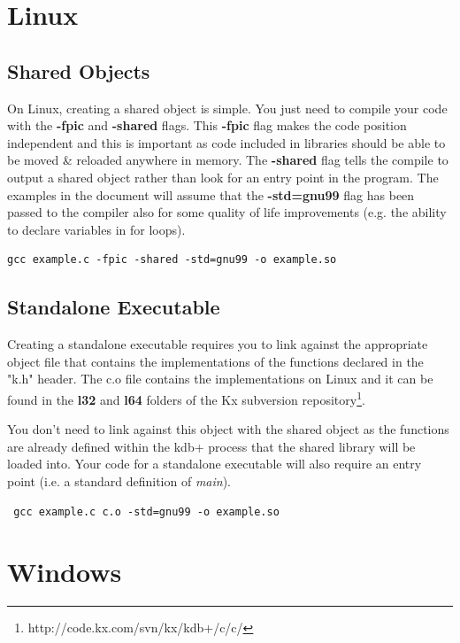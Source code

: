 \section{Linux}

\subsection{Shared Objects}
On Linux, creating a shared object is simple. You just need to compile your code with the \textbf{-fpic}
and \textbf{-shared} flags. This \textbf{-fpic} flag makes the code position independent and this is
important as code included in libraries should be able to be moved \& reloaded anywhere in memory. The
\textbf{-shared} flag tells the compile to output a shared object rather than look for an entry point
in the program. The examples in the document will assume that the \textbf{-std=gnu99} flag has been passed to
the compiler also for some quality of life improvements (e.g. the ability to declare variables in for
loops).

\begin{lstlisting}
gcc example.c -fpic -shared -std=gnu99 -o example.so
\end{lstlisting}

\subsection{Standalone Executable}

Creating a standalone executable requires you to link against the appropriate object file that
contains the implementations of the functions declared in the "k.h" header. The c.o file contains
the implementations on Linux and it can be found in the \textbf{l32} and \textbf{l64} folders of the Kx
subversion repository\footnote{http://code.kx.com/svn/kx/kdb+/c/c/}.
 
 You don't need to link against this object with the shared object as the functions are already
 defined within the kdb+ process that the shared library will be loaded into. Your code for a
 standalone executable will also require an entry point (i.e. a standard definition of \textit{main}).
 
 \begin{lstlisting}
 gcc example.c c.o -std=gnu99 -o example.so
 \end{lstlisting}
 
 \section{Windows}
 
